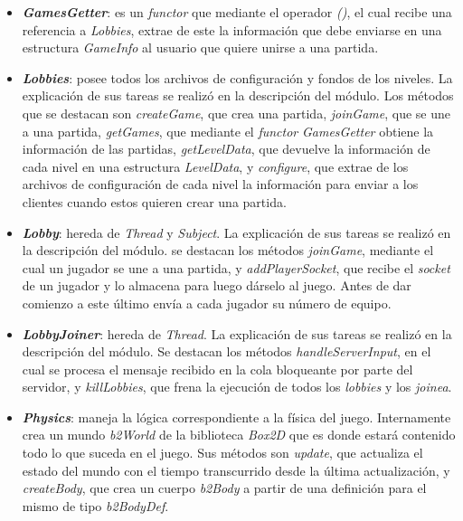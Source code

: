 \begin{itemize}
	\item \textbf{\textit{GamesGetter}}: es un \textit{functor} que mediante el operador \textit{()}, el cual recibe una referencia a \textit{Lobbies}, extrae de este la información que debe enviarse en una estructura \textit{GameInfo} al usuario que quiere unirse a una partida.
	
	\item \textbf{\textit{Lobbies}}: posee todos los archivos de configuración y fondos de los niveles. La explicación de sus tareas se realizó en la descripción del módulo. Los métodos que se destacan son \textit{createGame}, que crea una partida, \textit{joinGame}, que se une a una partida, \textit{getGames}, que mediante el \textit{functor} \textit{GamesGetter} obtiene la información de las partidas, \textit{getLevelData}, que devuelve la información de cada nivel en una estructura \textit{LevelData}, y \textit{configure}, que extrae de los archivos de configuración de cada nivel la información para enviar a los clientes cuando estos quieren crear una partida.
	
	\item \textbf{\textit{Lobby}}: hereda de \textit{Thread} y \textit{Subject}. La explicación de sus tareas se realizó en la descripción del módulo. se destacan los métodos \textit{joinGame}, mediante el cual un jugador se une a una partida, y \textit{addPlayerSocket}, que recibe el \textit{socket} de un jugador y lo almacena para luego dárselo al juego. Antes de dar comienzo a este último envía a cada jugador su número de equipo.
	
	\item \textbf{\textit{LobbyJoiner}}: hereda de \textit{Thread}. La explicación de sus tareas se realizó en la descripción del módulo. Se destacan los métodos \textit{handleServerInput}, en el cual se procesa el mensaje recibido en la cola bloqueante por parte del servidor, y \textit{killLobbies}, que frena la ejecución de todos los \textit{lobbies} y los \textit{joinea}.
	
	\item \textbf{\textit{Physics}}: maneja la lógica correspondiente a la física del juego. Internamente crea un mundo \textit{b2World} de la biblioteca \textit{Box2D} que es donde estará contenido todo lo que suceda en el juego. Sus métodos son \textit{update}, que actualiza el estado del mundo con el tiempo transcurrido desde la última actualización, y \textit{createBody}, que crea un cuerpo \textit{b2Body} a partir de una definición para el mismo de tipo \textit{b2BodyDef}.
	

\end{itemize}
